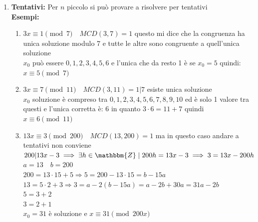 \documentclass[12pt, letterpaper]{report}
\begin{document}
\begin{enumerate}
			Dividiamo $a$ per $n \quad a = n\cdot q + r_a \implies ax = nqx + r_ax \equiv r_ax \pmod{n}$ \\
			Questo vale anche per $b$: $b = nq_b + r_b$ quindi $r_ax \equiv r_b \pmod{n}$ quindi stiamo prendendo i resti \\
			\textbf{Esempi:}
			\begin{enumerate}
				\item $11x \equiv 8 \pmod{5}$ consideriamo i resti nella divisione per 5\\
				$11 = 5 \cdot 2 + 1$ \\
				$8 = 5 + 3$ \\
				$x \equiv 3 \pmod{5}$
				\item $14x \equiv 6 \pmod{4}$ consideriamo i resti nella divisione per 4\\
				$14 = 4 \cdot 3 + 2$ \\
				$6 = 4 + 2$ \\
				$2x \equiv 2 \pmod{4}$ dividiamo tutto per 2
				$x \equiv 1 \pmod{\dfrac{4}{MCD(2,4)}} \implies x \equiv 1 \pmod{2}$
				\item $19x \equiv 3 \pmod{8}$ \\
				$19 = 8 \cdot 2 + 3$ \\
				$3x \equiv 3 \pmod{8}$ dividiamo per 3 e $MCD(3,8) = 1$, quindi: $x \equiv 1 \pmod{8}$
			\end{enumerate}
			\item \textbf{Tentativi:} Per $n$ piccolo si può provare a risolvere per tentativi \\
			\textbf{Esempi:}
			\begin{enumerate}
				\item $3x \equiv 1 \pmod{7} \quad MCD(3,7)=1$ questo mi dice che la congruenza ha unica soluzione modulo 7 e tutte le altre sono congruente a quell'unica soluzione \\
				$x_0$ può essere $0,1,2,3,4,5,6$ e l'unica che da resto 1 è se $x_0 = 5$ quindi: $x \equiv 5 \pmod{7}$
				\item  $3x \equiv 7 \pmod{11} \quad MCD(3,11) = 1|7$ esiste unica soluzione \\
				$x_0$ soluzione è compreso tra $0,1,2,3,4,5,6,7,8,9,10$ ed è solo 1 valore tra questi e l'unica corretta è: 6 in quanto $3 \cdot 6 = 11 + 7$ quindi $x \equiv 6 \pmod{11}$
				\item  $13x \equiv 3 \pmod{200} \quad MCD(13, 200) = 1$ ma in questo caso andare a tentativi non conviene \\
				$200|13x-3 \implies \exists h \in \mathbbm{Z} \mid 200h = 13x - 3 \implies 3 = 13x - 200h$ \\
				$a=13 \quad b=200$ \\
				$200 = 13 \cdot 15 + 5 \Rightarrow 5 = 200 - 13\cdot15 = b - 15a$ \\
				$13 = 5 \cdot 2 + 3 \Rightarrow 3 = a - 2(b - 15a) = a -2b + 30a = 31a -2b$ \\
				$5 = 3 + 2$ \\
				$3 = 2 + 1$ \\
				$x_0 = 31$ è soluzione e $x \equiv 31 \pmod{200x}$
			\end{enumerate}
		\end{enumerate}
\end{document}

